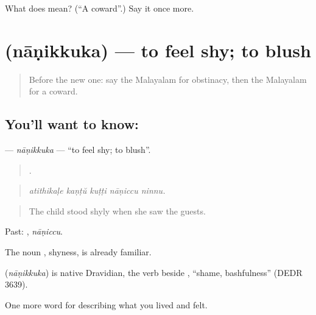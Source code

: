 \begin{tcolorbox}[breakable,colback=teal!4,colframe=teal!35!black,title={Before you move on}]
What does  mean? (\textquotedblleft{}A coward\textquotedblright{}.) Say it once more.
\end{tcolorbox}
\section[\texorpdfstring{\ml{നാണിക്കുക} (nāṇikkuka)}{നാണിക്കുക (nāṇikkuka)}]{ (nāṇikkuka) — to feel shy; to blush}

\label{lesson:ML-C530-nanikkuka}



\begin{quote}
Before the new one: say the Malayalam for obstinacy, then the Malayalam for a coward.
\end{quote}

\subsection*{You'll want to know: }
\textbf{} — \emph{nāṇikkuka} — \textquotedblleft{}to feel shy; to blush\textquotedblright{}.

\begin{quote}
    .
\end{quote}

\begin{quote}
\emph{atithikaḷe kaṇṭŭ kuṭṭi nāṇiccu ninnu.}
\end{quote}

\begin{quote}
The child stood shyly when she saw the guests.
\end{quote}

Past: , \emph{nāṇiccu}.

The noun , shyness, is already familiar.

\begin{cousinweb}
\textbf{} (\emph{nāṇikkuka}) is native Dravidian, the verb beside , \textquotedblleft{}shame, bashfulness\textquotedblright{} (DEDR 3639).
\end{cousinweb}

\begin{grammarlens}[title={What you've built}]
One more word for describing what you lived and felt.
\end{grammarlens}

